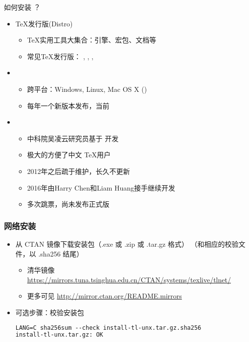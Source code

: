 \begin{frame}{如何安装 ？}
  \begin{itemize}
    \item \TeX{}发行版(Distro)
      \begin{itemize}
        \item \TeX{}实用工具大集合：引擎、宏包、文档等
        \item 常见\TeX{}发行版：
          \alert{\TL}, \CTeX, \MiKTeX, \MacTeX
      \end{itemize}
    \item \TL
      \begin{itemize}
        \item 跨平台：Windows, Linux, Mac OS X (\MacTeX)
        \item 每年一个新版本发布，当前 
      \end{itemize}
    \item \CTeX
      \begin{itemize}
        \item 中科院吴凌云研究员基于 \MiKTeX 开发
        \item 极大的方便了中文 \TeX 用户
        \item 2012年之后疏于维护，长久不更新
        \item 2016年由Harry Chen和Liam Huang接手继续开发
        \item 多次跳票，尚未发布正式版
      \end{itemize}
  \end{itemize}
\end{frame}

\begin{frame}[fragile]
  \frametitle{网络安装}
  \begin{itemize}
    \item 从 CTAN 镜像下载安装包（.exe 或 .zip 或 .tar.gz 格式）
      （和相应的校验文件，以 .sha256 结尾）
      \begin{itemize} %
        \item 清华镜像\\
          {\footnotesize \url{https://mirrors.tuna.tsinghua.edu.cn/CTAN/systems/texlive/tlnet/}}
        \item 更多可见 \url{http://mirror.ctan.org/README.mirrors}
      \end{itemize}

    \item 可选步骤：校验安装包
      \begin{lstlisting}[language=tex]
LANG=C sha256sum --check install-tl-unx.tar.gz.sha256
install-tl-unx.tar.gz: OK
      \end{lstlisting}

  \end{itemize}
\end{frame}

